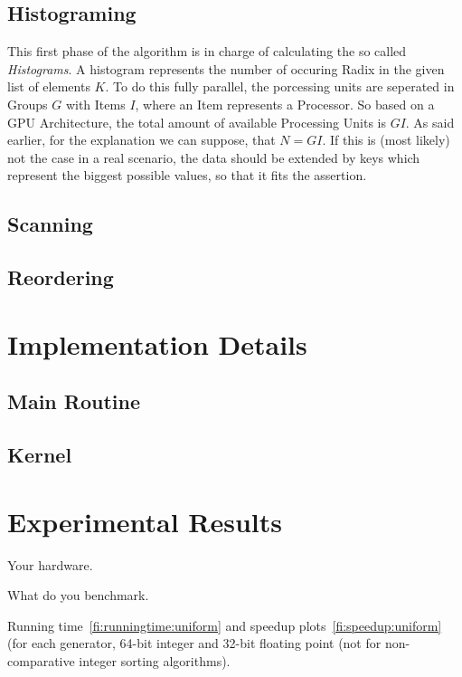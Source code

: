 \documentclass{llncs}
\begin{document}
\subsection{Histograming}
This first phase of the algorithm is in charge of calculating the so called \textit{Histograms}. A histogram represents the number of occuring Radix in the given list of elements $K$. To do this fully parallel, the porcessing units are seperated in Groups $G$ with Items $I$, where an Item represents a Processor. So based on a GPU Architecture, the total amount of available Processing Units is $GI$. As said earlier, for the explanation we can suppose, that $N=GI$. If this is (most likely) not the case in a real scenario, the data should be extended by keys which represent the biggest possible values, so that it fits the assertion. 





\subsection{Scanning}

\subsection{Reordering}

\section{Implementation Details}

\subsection{Main Routine}

\subsection{Kernel}

\section{Experimental Results}

Your hardware.

What do you benchmark.

Running time~\ref{fi:runningtime:uniform} and speedup plots~\ref{fi:speedup:uniform} (for each generator, 64-bit integer and 32-bit floating point (not for  non-comparative integer sorting algorithms).
\end{document}
